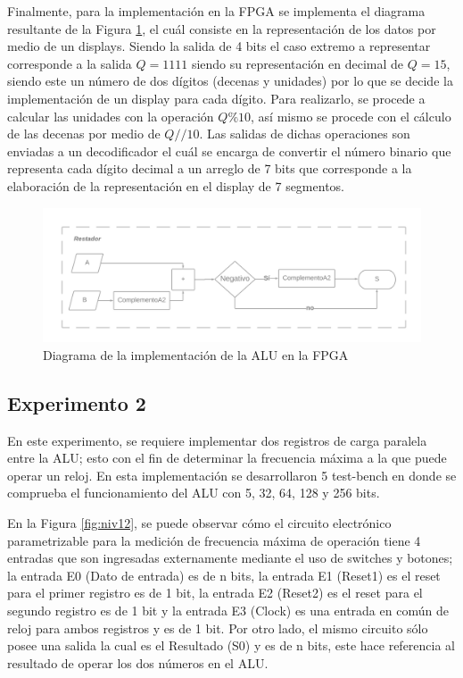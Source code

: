 \documentclass[journal]{IEEEtran}
\begin{document}
	
	Finalmente, para la implementación en la FPGA se implementa el diagrama resultante de la Figura \ref{fig:alufpga}, el cuál consiste en la representación de los datos por medio de un displays. Siendo la salida de 4 bits el caso extremo a representar corresponde a la salida $Q=1111$ siendo su representación en decimal de $Q=15$, siendo este un número de dos dígitos (decenas y unidades) por lo que se decide la implementación de un display para cada dígito. Para realizarlo, se procede a calcular las unidades con la operación $Q\%10$, así mismo se procede con el cálculo de las decenas por medio de $Q//10$. Las salidas de dichas operaciones son enviadas a un decodificador el cuál se encarga de convertir el número binario que representa cada dígito decimal a un arreglo de 7 bits que corresponde a la elaboración de la representación en el display de 7 segmentos.
	
	\begin{figure}[hbtp]
		\centering
		\includegraphics[scale = 0.07]{img/alu_fpga.png}
		\caption{Diagrama de la implementación de la ALU en la FPGA}
		\label{fig:alufpga}
	\end{figure}
	
	
	\subsection{Experimento 2}
	En este experimento, se requiere implementar dos registros de carga paralela entre la ALU; esto con el fin de determinar la frecuencia máxima a la que puede operar un reloj. En esta implementación se desarrollaron 5 test-bench en donde se comprueba el funcionamiento del ALU con 5, 32, 64, 128 y 256 bits.
	
	En la Figura \ref{fig:niv12}, se puede observar cómo el circuito electrónico parametrizable para la medición de frecuencia máxima de operación tiene 4 entradas que son ingresadas externamente mediante el uso de switches y botones; la entrada E0 (Dato de entrada) es de n bits, la entrada E1 (Reset1) es el reset para el primer registro es de 1 bit, la entrada E2 (Reset2) es el reset para el segundo registro es de 1 bit y la entrada E3 (Clock) es una entrada en común de reloj para ambos registros y es de 1 bit. Por otro lado, el mismo circuito sólo posee una salida la cual es el Resultado (S0) y es de n bits, este hace referencia al resultado de operar los dos números en el ALU.
	
\end{document}

